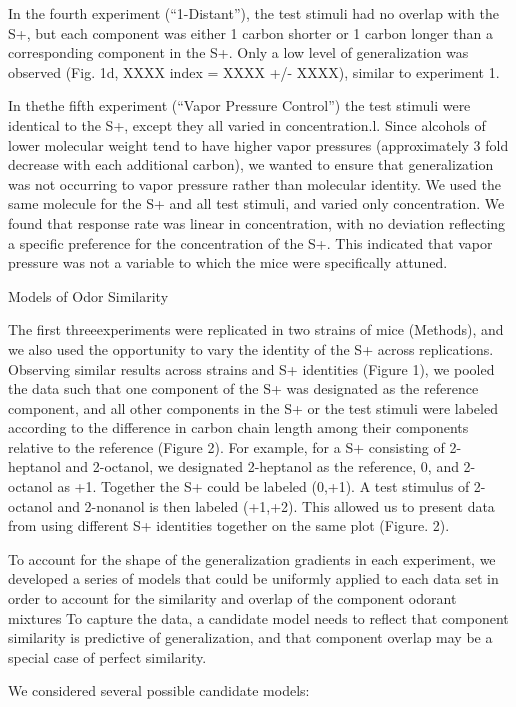 In the fourth experiment (“1-Distant”), the test stimuli had no overlap with the S+, but each component was either 1 carbon shorter or 1 carbon longer than a corresponding component in the S+.  Only a low level of generalization was observed (Fig. 1d, XXXX index = XXXX +/- XXXX), similar to experiment 1.  

In thethe fifth experiment (“Vapor Pressure Control”) the test stimuli were identical to the S+, except they all varied in concentration.l.  Since alcohols of lower molecular weight tend to have higher vapor pressures (approximately 3 fold decrease with each additional carbon), we wanted to ensure that generalization was not occurring to vapor pressure rather than molecular identity.  We used the same molecule for the S+ and all test stimuli, and varied only concentration.  We found that response rate was linear in concentration, with no deviation reflecting a specific preference for the concentration of the S+.  This indicated that vapor pressure was not a variable to which the mice were specifically attuned.  

Models of Odor Similarity

The first threeexperiments were replicated in two strains of mice (Methods), and we also used the opportunity to vary the identity of the S+ across replications.  Observing similar results across strains and S+ identities (Figure 1), we pooled the data such that one component of the S+ was designated as the reference component, and all other components in the S+ or the test stimuli were labeled according to the difference in carbon chain length among their components relative to the reference (Figure 2).  For example, for a S+ consisting of 2-heptanol and 2-octanol, we designated 2-heptanol as the reference, 0, and 2-octanol as +1.  Together the S+ could be labeled (0,+1).  A test stimulus of 2-octanol and 2-nonanol is then labeled (+1,+2).  This allowed us to present data from using different S+ identities together on the same plot (Figure. 2).  

To account for the shape of the generalization gradients in each experiment, we developed a series of models that could be uniformly applied to each data set in order to account for  the similarity and overlap of the component odorant mixtures  To capture the data, a candidate model needs to reflect that component similarity is predictive of generalization, and that component overlap may be a special case of perfect similarity.  

We considered several possible candidate models:

